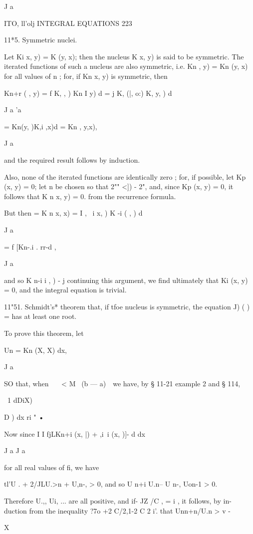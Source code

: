 {J a



ITO, ll'olj INTEGRAL EQUATIONS 223

11*5. Symmetric nuclei.

Let Ki x, y) = K (y, x); then the nucleus K x, y) is said to be
symmetric. The iterated functions of such a nucleus are also
symmetric, i.e. Kn , y) = Kn (y, x) for all values of n ; for, if Kn
x, y) is symmetric, then

Kn+r ( , y) = f K, , ) Kn I y) d = j K, (|, o:) K, y, ) d

J a 'a

= Kn(y, )K,i ,x)d = Kn , y,x),

J a

and the required result follows by induction.

Also, none of the iterated functions are identically zero ; for, if
possible, let Kp (x, y) = 0; let n be chosen so that 2"" <]) - 2",
and, since Kp (x, y) = 0, it follows that K n x, y) = 0. from the
recurrence formula.

But then = K n x, x) = I , \ i x, ) K -i ( , ) d

J a

= f [Kn-.i . rr-d ,

J a

and so K n-i i , ) - j continuing this argument, we find ultimately
that Ki (x, y) = 0, and the integral equation is trivial.

11"51. Schmidt's* theorem that, if tfoe nucleus is symmetric, the
equation J) ( ) = has at least one root.

To prove this theorem, let

Un = Kn (X, X) dx,

J a

SO that, when \ \ \ < M~ (b — a)~\ we have, by § 11-21 example 2 and §
114,

\ 1 dDiX)

D ) dx ri " •

Now since I I fjLKn+i (x, |) + ,i\ i (x, )]- d dx

J a J a

for all real values of fi, we have

tl'U . + 2/JLU.>n + U,n-, > 0, and so U n+i U.n-- U n-, Uon-1 > 0.

Therefore U.,, Ui, ... are all positive, and if- JZ /C , = i , it
follows, by in- duction from the inequality ?7o +2 C/2,1-2 C 2 i'.
that Unn+n/U.n > v -

X

}
